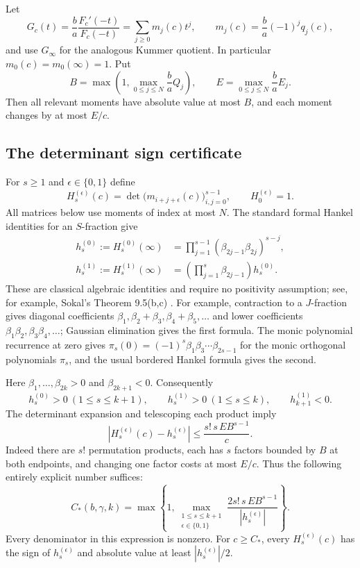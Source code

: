 \documentclass[11pt,a4paper]{article}
\theoremstyle{remark}
\begin{document}
Let
\[
 G_c(t)=\frac ba\frac{F_c'(-t)}{F_c(-t)}=\sum_{j\ge0}m_j(c)t^j,
 \qquad m_j(c)=\frac ba(-1)^jq_j(c),
\]
and use $G_\infty$ for the analogous Kummer quotient. In particular
$m_0(c)=m_0(\infty)=1$. Put
\[
 B=\max\left(1,\max_{0\le j\le N}\frac baQ_j\right),\qquad
 E=\max_{0\le j\le N}\frac baE_j.
\]
Then all relevant moments have absolute value at most $B$, and each
moment changes by at most $E/c$.

\subsection{The determinant sign certificate}
For $s\ge1$ and $\epsilon\in\{0,1\}$ define
\[
 H_s^{(\epsilon)}(c)
   =\det\bigl(m_{i+j+\epsilon}(c)\bigr)_{i,j=0}^{s-1},\qquad
 H_0^{(\epsilon)}=1.
\]
All matrices below use moments of index at most $N$. The standard formal
Hankel identities for an $S$-fraction give
\begin{align*}
 h_s^{(0)}:=H_s^{(0)}(\infty)
 &=\prod_{j=1}^{s-1}(\beta_{2j-1}\beta_{2j})^{s-j},\\
 h_s^{(1)}:=H_s^{(1)}(\infty)
 &=\left(\prod_{j=1}^{s}\beta_{2j-1}\right)h_s^{(0)}.
\end{align*}
These are classical algebraic identities and require no positivity
assumption; see, for example, Sokal's Theorem 9.5(b,c)
\cite{sokal2023}.
For example, contraction to a $J$-fraction gives diagonal coefficients
$\beta_1,\beta_2+\beta_3,\beta_4+\beta_5,\ldots$ and lower coefficients
$\beta_1\beta_2,\beta_3\beta_4,\ldots$; Gaussian elimination gives the first
formula. The monic polynomial recurrence at zero gives
$\pi_s(0)=(-1)^s\beta_1\beta_3\cdots\beta_{2s-1}$ for the monic
orthogonal polynomials $\pi_s$, and the usual bordered
Hankel formula gives the second.

Here $\beta_1,\ldots,\beta_{2k}>0$ and $\beta_{2k+1}<0$. Consequently
\[
 h_s^{(0)}>0\ (1\le s\le k+1),\qquad
 h_s^{(1)}>0\ (1\le s\le k),\qquad h_{k+1}^{(1)}<0.
\]
The determinant expansion and telescoping each product imply
\begin{equation}\label{eq:sokal-det-error}
 \left|H_s^{(\epsilon)}(c)-h_s^{(\epsilon)}\right|
 \le \frac{s!\,s\,E B^{s-1}}{c}.
\end{equation}
Indeed there are $s!$ permutation products, each has $s$ factors bounded
by $B$ at both endpoints, and changing one factor costs at most $E/c$.
Thus the following entirely explicit number suffices:
\begin{equation}\label{eq:sokal-effective-threshold}
 C_*(b,\gamma,k)=\max\left\{1,
 \max_{\substack{1\le s\le k+1\\\epsilon\in\{0,1\}}}
 \frac{2s!\,s\,E B^{s-1}}{|h_s^{(\epsilon)}|}\right\}.
\end{equation}
Every denominator in this expression is nonzero. For $c\ge C_*$, every
$H_s^{(\epsilon)}(c)$ has the sign of $h_s^{(\epsilon)}$ and absolute value
at least $|h_s^{(\epsilon)}|/2$.
\end{document}

